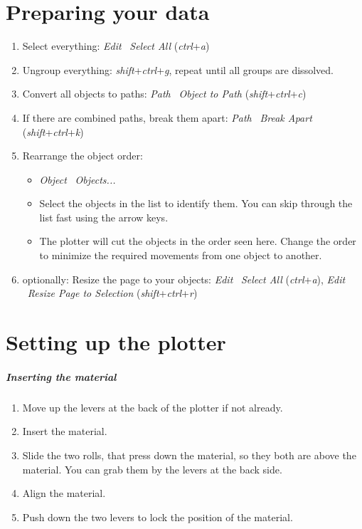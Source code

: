 {\let\clearpage\relax \chapter{Preparing your data}}
\begin{enumerate}
	\item Select everything: \textit{Edit} \rarr\ \textit{Select All} (\textit{ctrl}+\textit{a})
	\item Ungroup everything: \textit{shift}+\textit{ctrl}+\textit{g}, repeat until all groups are dissolved.
	\item Convert all objects to paths: \textit{Path} \rarr\ \textit{Object to Path} (\textit{shift}+\textit{ctrl}+\textit{c})
	\item If there are combined paths, break them apart: \textit{Path} \rarr\ \textit{Break Apart} (\textit{shift}+\textit{ctrl}+\textit{k})
	\item Rearrange the object order:
		\begin{itemize}
			\item \textit{Object} \rarr\ \textit{Objects...}
			\item Select the objects in the list to identify them. You can skip through the list fast using the arrow keys.
			\item The plotter will cut the objects in the order seen here. Change the order to minimize the required movements from one object to another.
		\end{itemize}
	\item optionally: Resize the page to your objects: \textit{Edit} \rarr\ \textit{Select All} (\textit{ctrl}+\textit{a}), \textit{Edit} \rarr\ \textit{Resize Page to Selection} (\textit{shift}+\textit{ctrl}+\textit{r})
\end{enumerate}

{\let\clearpage\relax \chapter{Setting up the plotter}}
\paragraph{Inserting the material}
\begin{enumerate}
	\item Move up the levers at the back of the plotter if not already.
	\item Insert the material.
	\item Slide the two rolls, that press down the material, so they both are above the material. You can grab them by the levers at the back side.
	\item Align the material.
	\item Push down the two levers to lock the position of the material.
\end{enumerate}

